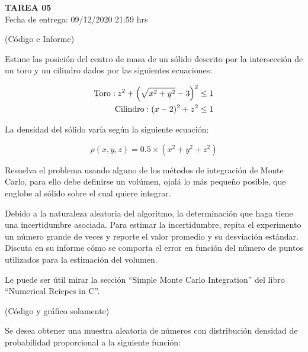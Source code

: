 \documentclass[letter, 11pt]{article}
\newcommand{\tareanro}{05}
\newcommand{\fechaentrega}{09/12/2020 21:59 hrs}
\begin{document}
\thispagestyle{firstpage}

\begin{center}
  {\uppercase{\LARGE \bf Tarea \tareanro}}\\
  Fecha de entrega: \fechaentrega
\end{center}


 (Código e Informe)

Estime las posición del centro de masa de un sólido descrito por la
intersección de un toro y un cilindro dados por las siguientes ecuaciones:

\begin{align}
  {\rm Toro} : z^2 + \left( \sqrt{x^2 + y^2} - 3 \right)^2 &\leq 1\\
  {\rm Cilindro} : (x - 2)^2 + z^2 &\leq 1
\end{align}

La densidad del sólido varía según la siguiente ecuación:

$$ \rho(x, y, z) = 0.5 \times (x^2 + y^2 + z^2) $$

Resuelva el problema usando alguno de los métodos de integración de Monte
Carlo, para ello debe definirse un volúmen, ojalá lo más pequeño posible, que
englobe al sólido sobre el cual quiere integrar.

Debido a la naturaleza aleatoria del algoritmo, la determinación que haga tiene
una incertidumbre asociada. Para estimar la incertidumbre, repita el
experimento un número grande de veces y reporte el valor promedio y su
desviación estándar. Discuta en su informe cómo se comporta el error en función
del número de puntos utilizados para la estimación del volumen.

\begin{ayuda}
  \small

  Le puede ser útil mirar la sección ``Simple Monte Carlo Integration'' del
  libro ``Numerical Reicpes in C''.

\end{ayuda}

\vspace{1em}
 (Código y gráfico solamente)

Se desea obtener una muestra aleatoria de números con distribución densidad de
probabilidad proporcional a la siguiente función:
\end{document}

